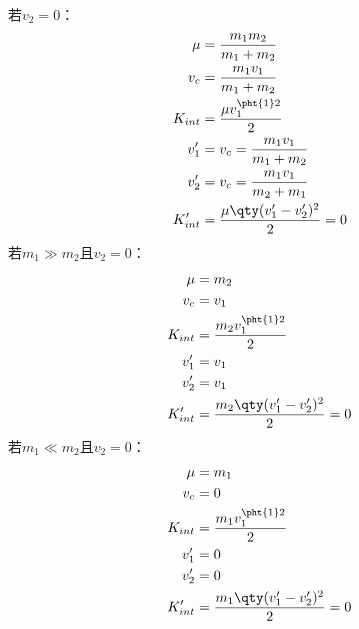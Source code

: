 \documentclass[a4paper,12pt]{article}
\begin{document}
若$v_2=0$：
\[\begin{aligned}
\mu&=\frac{m_1m_2}{m_1+m_2}\\
v_c &= \frac{m_1v_1}{m_1+m_2} \\
K_{int} &= \frac{\mu v_1^{\pht{1}2}}{2}\\
v_1' &= v_c = \frac{m_1v_1}{m_1+m_2} \\
v_2' &= v_c = \frac{m_1v_1}{m_2+m_1} \\
K_{int}' &= \frac{\mu \qty(v_1'-v_2')^2}{2} = 0
\end{aligned}\]
若$m_1\gg m_2$且$v_2=0$：
\[\begin{aligned}
\mu&=m_2\\
v_c &= v_1 \\
K_{int} &= \frac{m_2v_1^{\pht{1}2}}{2}\\
v_1' &= v_1 \\
v_2' &= v_1 \\
K_{int}' &= \frac{m_2 \qty(v_1'-v_2')^2}{2} = 0
\end{aligned}\]
若$m_1\ll m_2$且$v_2=0$：
\[\begin{aligned}
\mu&=m_1\\
v_c &= 0 \\
K_{int} &= \frac{m_1v_1^{\pht{1}2}}{2}\\
v_1' &= 0 \\
v_2' &= 0 \\
K_{int}' &= \frac{m_1\qty(v_1'-v_2')^2}{2} = 0
\end{aligned}\]
\end{document}
